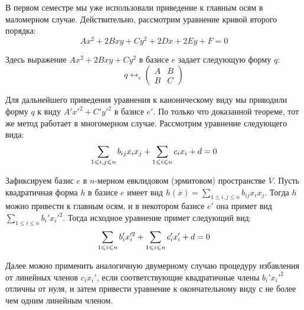 \begin{note}
	В первом семестре мы уже использовали приведение к главным осям в маломерном случае. Действительно, рассмотрим уравнение кривой второго порядка:
	\[Ax^2 + 2Bxy + Cy^2 + 2Dx + 2Ey + F = 0\]
	
	Здесь выражение $Ax^2 + 2Bxy + Cy^2$ в базисе $e$ задает следующую форму $q$:
	\[q \leftrightarrow_e \begin{pmatrix}A&B\\B&C\end{pmatrix}\]
	
	Для дальнейшего приведения уравнения к каноническому виду мы приводили форму $q$ к виду $A'x'^2 + C'y'^2$ в базисе $e'$. По только что доказанной теореме, тот же метод работает в многомерном случае. Рассмотрим уравнение следующего вида:
	\[\sum_{1 \le i, j \le n}b_{ij}x_ix_j + \sum_{1 \le i \le n}c_ix_i \hm{+} d = 0\]
	
	Зафиксируем базис $e$ в $n$-мерном евклидовом (эрмитовом) пространстве $V$. Пусть квадратичная форма $h$ в базисе $e$  имеет вид
	$h(\overline{x}) = \sum_{1 \le i, j \le n}b_{ij}x_ix_j$. Тогда $h$ можно привести к главным осям, и в некотором базисе $e'$ она примет вид $\sum_{1 \le i \le n}b_i'x_i'^2$. Тогда исходное уравнение примет следующий вид:
	\[\sum_{1 \le i \le n}b_i'x_i'^2 \hm{+} \sum_{1 \le i \le n}c_i'x_i' + d = 0\]
	
	Далее можно применить аналогичную двумерному случаю процедуру избавления от линейных членов $c_ix_i'$, если соответствующие квадратичные члены $b_i'x_i'^2$ отличны от нуля, и затем привести уравнение к окончательному виду с не более чем одним линейным членом.
\end{note}